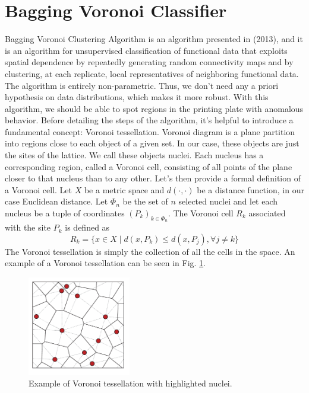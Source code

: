 \section{Bagging Voronoi Classifier}
\label{sec:bvc}
Bagging Voronoi Clustering Algorithm is an algorithm presented in \citeauthor{secchi_bagging_2013} (2013), and it is an algorithm for unsupervised classification of functional data that exploits spatial dependence by repeatedly generating random connectivity maps and by clustering, at each replicate, local representatives of neighboring functional data. The algorithm is entirely non-parametric. Thus, we don't need any a priori hypothesis on data distributions, which makes it more robust. With this algorithm, we should be able to spot regions in the printing plate with anomalous behavior. Before detailing the steps of the algorithm, it's helpful to introduce a fundamental concept: Voronoi tessellation. Voronoi diagram is a plane partition into regions close to each object of a given set. In our case, these objects are just the sites of the lattice. We call these objects nuclei. Each nucleus has a corresponding region, called a Voronoi cell, consisting of all points of the plane closer to that nucleus than to any other. Let's then provide a formal definition of a Voronoi cell. Let $X$ be a metric space and $d(\cdot, \cdot)$ be a distance function, in our case Euclidean distance. Let $\Phi_n$ be the set of $n$ selected nuclei and let each nucleus be a tuple of coordinates $\left(P_k\right)_{k\in \Phi_n}$. The Voronoi cell $R_k$ associated with the site $P_k$ is defined as
\begin{equation}
    \label{eq:voronoicell}
    R_k=\{x\in X \mid d(x, P_k)\leq d(x, P_j),\forall j\neq k\}
\end{equation}
The Voronoi tessellation is simply the collection of all the cells in the space.
An example of a Voronoi tessellation can be seen in Fig. \ref{fig:voronoi}.
\begin{figure}[H]
    \centering
    \includegraphics[width=0.4\textwidth]{Images/A-set-of-atoms-the-associated-Voronoi-tessellation-solid-lines-and-the-Delaunay.png}
    \caption[Voronoi tessellation.]{Example of Voronoi tessellation with highlighted nuclei.}
    \label{fig:voronoi}
\end{figure}


